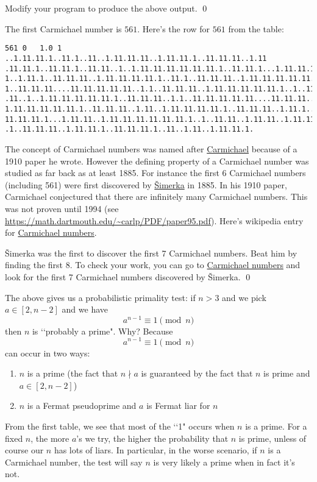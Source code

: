 \begin{ex}
  Modify your program to produce the above output.
  \qed
\end{ex}

The first Carmichael number is $561$. Here's the row for $561$
from the table:
\begin{Verbatim}[frame=single,fontsize=\footnotesize]
561 0   1.0 1 ..1.11.11.1..11.1..11..1.11.11.11..1.11.11.1..11.11.11..1.11
.11.11.1..11.11.1..11.11..1..1.11.11.11.11.11.11.1..11.11.1...1.11.11.11.1
1..1.11.1..11.11.11..1.11.11.11.11.1..11.1..11.11.11..1.11.11.11.11.11.11.
1..11.11.11....11.11.11.11.11..1.1..11.11.11..1.11.11.11.11.11.1..1..11.11
.11..1..1.11.11.11.11.11.1..11.11.11..1.1..11.11.11.11.11....11.11.11..1.1
1.11.11.11.11.11.1..11.11.11..1.11..1.11.11.11.11.1..11.11.11..1.11.1..11.
11.11.11.1...1.11.11..1.11.11.11.11.11.11.1..1..11.11..1.11.11..1.11.11.11
.1..11.11.11..1.11.11.1..11.11.11.1..11..1.11..1.11.11.1.
\end{Verbatim}

The concept of Carmichael numbers was named after
\href{https://en.wikipedia.org/wiki/Robert_Daniel_Carmichael}{Carmichael}
because of a 1910 paper he wrote.
However the defining property of a Carmichael number was studied as far back
as at least 1885.
For instance the first 6 Carmichael numbers (including 561) were
first discovered by
\href{https://en.wikipedia.org/wiki/V%C3%A1clav_%C5%A0imerka}{\v{S}imerka}
in 1885.
In his 1910 paper,
Carmichael conjectured that there are infinitely many Carmichael numbers.
This was not proven until 1994
(see \url{https://math.dartmouth.edu/~carlp/PDF/paper95.pdf}).
Here's wikipedia entry for
\href{https://en.wikipedia.org/wiki/Carmichael_number}{Carmichael numbers}.

\begin{ex}
  \v{S}imerka was the first to discover the first 7 Carmichael numbers.
  Beat him by finding the first 8.
  To check your work, you can go to 
  \href{https://en.wikipedia.org/wiki/Carmichael_number}{Carmichael numbers}
  and look for the first 7 Carmichael numbers discovered by \v{S}imerka.
  \qed
\end{ex}

The above gives us a probabilistic primality test:
if $n > 3$ and we pick $a \in [2, n-2]$ and we have
\[
a^{n-1} \equiv 1 \pmod{n}
\]
then $n$ is \lq\lq probably a prime".
Why?
Because
\[
a^{n-1} \equiv 1 \pmod{n}
\]
can occur in two ways:
\begin{enumerate}[nosep]
\item $n$ is a prime (the fact that $n \nmid a$ is guaranteed by the fact that
  $n$ is prime and $a \in [2, n-2]$)
\item $n$ is a Fermat pseudoprime and $a$ is Fermat liar for $n$
\end{enumerate}
From the first table, we see that most of the \lq\lq 1" occurs when
$n$ is a prime.
For a fixed $n$,
the more $a$'s we try, the higher the probability that $n$ is prime,
unless of course our $n$ has lots of liars.
In particular, in the worse scenario, if $n$ is a Carmichael number,
the test will say $n$ is very likely a prime when in fact it's not.


